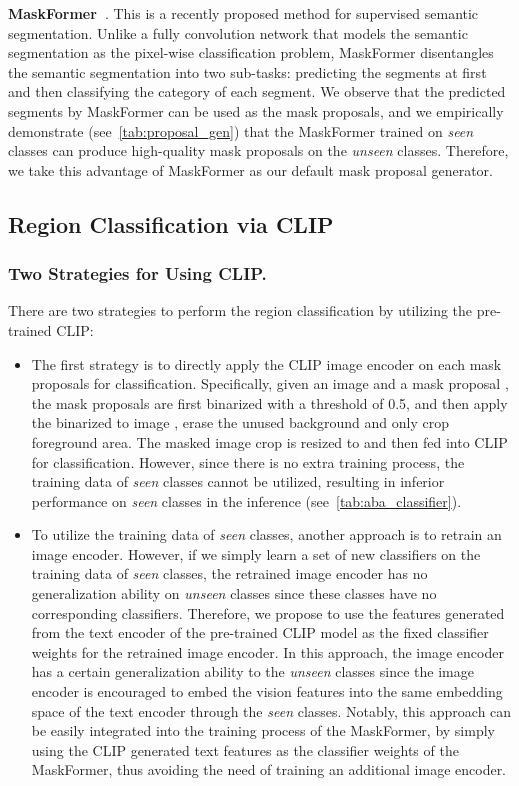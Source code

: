 \documentclass[runningheads]{llncs}
\begin{document}
\noindent\textbf{MaskFormer~\cite{cheng2021per}}. 
This is a recently proposed method for supervised semantic segmentation. Unlike a fully convolution network that models the semantic segmentation as the pixel-wise classification problem, MaskFormer disentangles the semantic segmentation into two sub-tasks: predicting the segments at first and then classifying the category of each segment. We observe that the predicted segments by MaskFormer can be used as the mask proposals, and we empirically demonstrate (see~\cref{tab:proposal_gen}) that the MaskFormer trained on \emph{seen} classes can produce high-quality mask proposals on the \emph{unseen} classes. Therefore, we take this advantage of MaskFormer as our default mask proposal generator.

\subsection{Region Classification via CLIP}
\label{sec:region_classification}

\subsubsection{Two Strategies for Using CLIP.}
\label{sec:two_strategies}
There are two strategies to perform the region classification by utilizing the pre-trained CLIP:
\begin{itemize}
    \item The first strategy is to directly apply the CLIP image encoder on each mask proposals for classification. Specifically, given an image  and a mask proposal , the mask proposals are first binarized with a threshold of 0.5, and then apply the binarized  to image , erase the unused background and only crop foreground area. The masked image crop is resized to  and then fed into CLIP for classification. However, since there is no extra training process, the training data of \emph{seen} classes cannot be utilized, resulting in inferior performance on \emph{seen} classes in the inference (see~\cref{tab:aba_classifier}).
    
    
    \item To utilize the training data of \emph{seen} classes, another approach is to retrain an image encoder. However, if we simply learn a set of new classifiers on the training data of \emph{seen} classes, the retrained image encoder has no generalization ability on \emph{unseen} classes since these classes have no corresponding classifiers. Therefore, we propose to use the features generated from the text encoder of the pre-trained CLIP model as the fixed classifier weights for the retrained image encoder. In this approach, the image encoder has a certain generalization ability to the \emph{unseen} classes since the image encoder is encouraged to embed the vision features into the same embedding space of the text encoder through the \emph{seen} classes.
    Notably, this approach can be easily integrated into the training process of the MaskFormer, by simply using the CLIP generated text features as the classifier weights of the MaskFormer, thus avoiding the need of training an additional image encoder.
\end{itemize}
\end{document}
